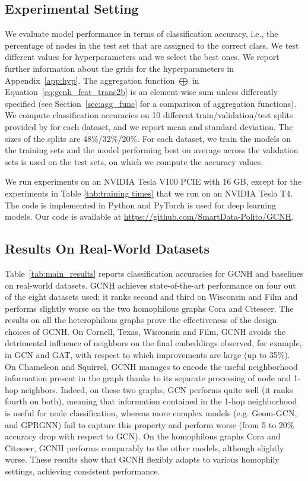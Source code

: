 \documentclass[conference]{IEEEtran}
\begin{document}
\subsection{Experimental Setting}
We evaluate model performance in terms of classification accuracy, i.e., the percentage of nodes in the test set that are assigned to the correct class.
We test different values for hyperparameters and we select the best ones. We report further information about the grids for the hyperparameters in Appendix~\ref{app:hyp}. The aggregation function $\bigoplus$ in Equation~\eqref{eq:gcnh_feat_trans2b} is an element-wise sum unless differently specified (see Section~\ref{sec:agg_func} for a comparison of aggregation functions).
We compute classification accuracies on 10 different train/validation/test splits provided by \cite{pei_geom-gcn_2019} for each dataset, and we report mean and standard deviation. The sizes of the splits are 48\%/32\%/20\%. For each dataset, we train the models on the training sets and the model performing best on average across the validation sets is used on the test sets, on which we compute the accuracy values.

We run experiments on an NVIDIA Tesla V100 PCIE with 16 GB, except for the experiments in Table \ref{tab:training times} that we run on an NVIDIA Tesla T4. The code is implemented in Python and PyTorch is used for deep learning models. Our code is available at \url{https://github.com/SmartData-Polito/GCNH}.


\subsection{Results On Real-World Datasets}
Table~\ref{tab:main_results} reports classification accuracies for GCNH and baselines on real-world datasets. 
GCNH achieves state-of-the-art performance on four out of the eight datasets used; it ranks second and third on Wisconsin and Film and performs slightly worse on the two homophilous graphs Cora and Citeseer.
The results on all the heterophilous graphs prove the effectiveness of the design choices of GCNH. 
On Cornell, Texas, Wisconsin and Film, GCNH avoids the detrimental influence of neighbors on the final embeddings observed, for example, in GCN and GAT, with respect to which improvements are large (up to 35\%).
On Chameleon and Squirrel, GCNH manages to encode the useful neighborhood information present in the graph thanks to its separate processing of node and 1-hop neighbors. Indeed, on these two graphs, GCN performs quite well (it ranks fourth on both), meaning that information contained in the 1-hop neighborhood is useful for node classification, whereas more complex models (e.g. Geom-GCN, \htwogcn{} and GPRGNN) fail to capture this property and perform worse (from 5 to 20\% accuracy drop with respect to GCN). 
On the homophilous graphs Cora and Citeseer, GCNH performs comparably to the other models, although slightly worse. 
These results show that GCNH flexibly adapts to various homophily settings, achieving consistent performance.
\end{document}
